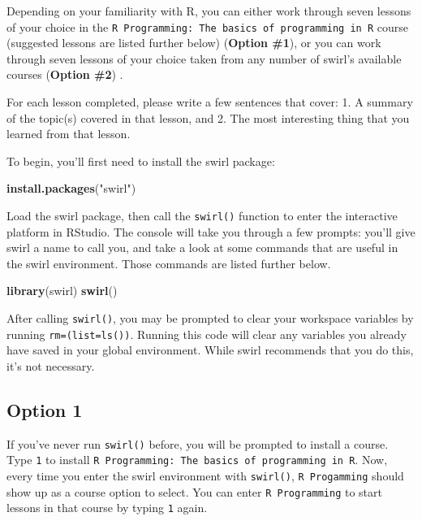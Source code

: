 \documentclass[]{book}
\makeatletter
\newenvironment{Shaded}{\begin{snugshade}}{\end{snugshade}}
\newcommand{\KeywordTok}[1]{\textcolor[rgb]{0.13,0.29,0.53}{\textbf{#1}}}
\newcommand{\StringTok}[1]{\textcolor[rgb]{0.31,0.60,0.02}{#1}}
\newcommand{\NormalTok}[1]{#1}
\newenvironment{kframe}{%
\medskip{}
\setlength{\fboxsep}{.8em}
 \def\at@end@of@kframe{}%
 \ifinner\ifhmode%
  \def\at@end@of@kframe{\end{minipage}}%
  \begin{minipage}{\columnwidth}%
 \fi\fi%
 \def\FrameCommand##1{\hskip\@totalleftmargin \hskip-\fboxsep
 \colorbox{shadecolor}{##1}\hskip-\fboxsep
     \hskip-\linewidth \hskip-\@totalleftmargin \hskip\columnwidth}%
 \MakeFramed {\advance\hsize-\width
   \@totalleftmargin\z@ \linewidth\hsize
   \@setminipage}}%
 {\par\unskip\endMakeFramed%
 \at@end@of@kframe}
\renewenvironment{Shaded}{\begin{kframe}}{\end{kframe}}
\newenvironment{rmdblock}[1]
  {
  \begin{itemize}
  \renewcommand{\labelitemi}{
    \raisebox{-.7\height}[0pt][0pt]{
      {\setkeys{Gin}{width=3em,keepaspectratio}\texttt{[image: images/\#1]}}
    }
  }
  \setlength{\fboxsep}{1em}
  \begin{kframe}
  \item
  }
  {
  \end{kframe}
  \end{itemize}
  }
\newenvironment{rmdnote}
  {\begin{rmdblock}{note}}
  {\end{rmdblock}}
\theoremstyle{definition}
\theoremstyle{definition}
\theoremstyle{definition}
\theoremstyle{remark}
\makeatother
\begin{document}
Depending on your familiarity with R, you can either work through seven
lessons of your choice in the
\texttt{R\ Programming:\ The\ basics\ of\ programming\ in\ R} course
(suggested lessons are listed further below) (\textbf{Option \#1}), or
you can work through seven lessons of your choice taken from any number
of swirl's available courses (\textbf{Option \#2}) .

For each lesson completed, please write a few sentences that cover: 1. A
summary of the topic(s) covered in that lesson, and 2. The most
interesting thing that you learned from that lesson.

To begin, you'll first need to install the swirl package:

\begin{Shaded}
\begin{Highlighting}[]
\KeywordTok{install.packages}\NormalTok{(}\StringTok{"swirl"}\NormalTok{)}
\end{Highlighting}
\end{Shaded}

Load the swirl package, then call the \texttt{swirl()} function to enter
the interactive platform in RStudio. The console will take you through a
few prompts: you'll give swirl a name to call you, and take a look at
some commands that are useful in the swirl environment. Those commands
are listed further below.

\begin{Shaded}
\begin{Highlighting}[]
\KeywordTok{library}\NormalTok{(swirl)}
\KeywordTok{swirl}\NormalTok{()}
\end{Highlighting}
\end{Shaded}

\begin{rmdnote}
After calling \texttt{swirl()}, you may be prompted to clear your
workspace variables by running \texttt{rm=(list=ls())}. Running this
code will clear any variables you already have saved in your global
environment. While swirl recommends that you do this, it's not
necessary.
\end{rmdnote}

\subsection{Option 1}\label{option-1}

If you've never run \texttt{swirl()} before, you will be prompted to
install a course. Type \texttt{1} to install
\texttt{R\ Programming:\ The\ basics\ of\ programming\ in\ R}. Now,
every time you enter the swirl environment with \texttt{swirl()},
\texttt{R\ Progamming} should show up as a course option to select. You
can enter \texttt{R\ Programming} to start lessons in that course by
typing \texttt{1} again.
\end{document}
